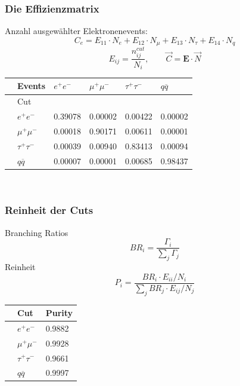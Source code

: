 \begin{frame}
	\frametitle{Die Effizienzmatrix}
	Anzahl ausgewählter Elektronenevents:
	\begin{equation*}
	C_e = E_{11} \cdot N_{e} + E_{12} \cdot N_\mu +E_{13} \cdot N_\tau+E_{14} \cdot N_q
	\end{equation*}
	\begin{equation*}
	E_{ij}=\frac{n^{cut}_{ij}}{N_i},\qquad \vec{C}=\boldsymbol{E}\cdot\vec{N}
	\end{equation*}
	\begin{table}[H]\centering
		\begin{tabular}{@{}llllll@{}}
			\toprule
			&Events &$e^+e^-$&$\mu^+\mu^-$&$\tau^+\tau^-$&$q\overline{q}$\\
			\midrule
			&Cut&&&&\\
			&$e^+e^-$&0.39078&0.00002&0.00422&0.00002\\
			&$\mu^+\mu^-$&0.00018&0.90171&0.00611&0.00001\\
			&$\tau^+\tau^-$&0.00039&0.00940&0.83413&0.00094\\
			&$q\overline{q}$&0.00007&0.00001&0.00685&0.98437\\
		\end{tabular}\\
		\noindent{}
	\end{table}
\end{frame}

\begin{frame}
	\frametitle{Reinheit der Cuts}
	\hspace{2cm} Branching Ratios
	\begin{equation*}
		BR_i=\frac{\Gamma_i}{\sum_{j}\Gamma_{j}}
	\end{equation*}
	\hspace{2cm} Reinheit
	\begin{equation*}
		P_i=\frac{BR_i\cdot E_{ii}/N_i}{\sum_{j}BR_j\cdot E_{ij}/N_j}
	\end{equation*}
	\begin{table}\centering
		\begin{tabular}{@{}lll@{}}
			\toprule
			&Cut&Purity\\
			\midrule
			&$e^+e^-$&0.9882\\
			&$\mu^+\mu^-$&0.9928\\
			&$\tau^+\tau^-$&0.9661\\
			&$q\overline{q}$&0.9997\\
			\bottomrule
		\end{tabular}
	\end{table}
\end{frame}

